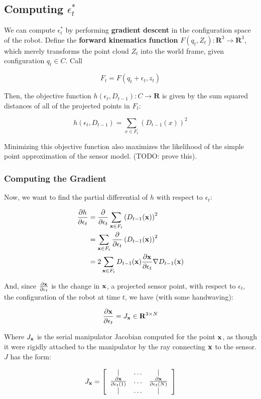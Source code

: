 \documentclass{article}
\begin{document}
\subsection{Computing $\epsilon^*_t$}

We can compute $\epsilon^*_t$ by performing \textbf{gradient descent} in the
configuration space of the robot.  Define the \textbf{forward kinematics
function} $F(q_t, Z_t) : \mathbf{R}^3 \to \mathbf{R}^3$, which merely
transforms the point cloud $Z_t$ into the world frame, given configuration $q_t
\in C$. Call

$$ F_t = F(q_t + \epsilon_t, z_t) $$

Then, the objective function $h(\epsilon_t, D_{t-1}) : C \to \mathbf{R}$ is
given by the sum squared distances of all of the projected points in $F_t$:

$$ h(\epsilon_t, D_{t-1}) = \sum_{x \in F_t}\left(D_{t-1}(x)\right) ^2 $$

Minimizing this objective function also maximizes the likelihood of the simple point approximation of the sensor model. (TODO: prove this).

\subsubsection{Computing the Gradient}

Now, we want to find the partial differential of $h$ with respect to
$\epsilon_t$:


\begin{align} 
\frac{\partial{h}}{\partial{\epsilon_t}} &= \frac{\partial}{\partial \epsilon_t}  \sum_{\mathbf{x} \in F_t}\left(D_{t-1}(\mathbf{x})\right) ^2 \\
 &= \sum_{\mathbf{x} \in F_t} \frac{\partial}{\partial \epsilon_t} \left(D_{t-1}(\mathbf{x})\right) ^2 \\ 
 &= 2\sum_{\mathbf{x} \in F_t} D_{t-1}(\mathbf{x}) \frac{\partial \mathbf{x}}{\partial \epsilon_t} \nabla D_{t-1}(\mathbf{x})
\end{align} 

And, since $\frac{\partial \mathbf{x}}{\partial \epsilon_t}$ is the change in $\mathbf{x}$, a projected sensor point, with
respect to $\epsilon_t$, the configuration of the robot at time $t$, we have (with some
handwaving):

$$ \frac{\partial \mathbf{x}}{\partial \epsilon_t} = J_{\mathbf{x}} \in \mathbf{R}^{3 \times N}$$

Where $J_{\mathbf{x}}$ is the serial manipulator Jacobian computed for
the point $\mathbf{x}$, as though it were rigidly attached to the manipulator by
the ray connecting $\mathbf{x}$ to the sensor. $J$ has the form:

\begin{equation} J_{\mathbf{x}} = \left[
\begin{array}{ccc}
| & \ldots & | \\
\frac{\partial \mathbf{x}}{\partial \epsilon_t(1)} & \ldots & \frac{\partial
\mathbf{x}}{\partial \epsilon_t(N)}  \\
| & \ldots & |
\end{array}
\right]
\end{equation}
\end{document}
